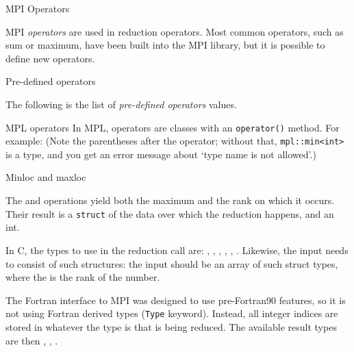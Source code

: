 
 {MPI Operators}
\label{sec:mpi-ops}

MPI \emph{operators} are used in reduction operators. Most common
operators, such as sum or maximum, have been built into the MPI
library, but it is possible to define new operators.

 {Pre-defined operators}
\label{sec:operator-list}

The following is the list of \emph{pre-defined operators}
 values.



\begin{mplnote}{MPL operators}
  In \ac{MPL}, operators are classes with an \lstinline+operator()+ method.
  For example:
  (Note the parentheses after the operator; without that, \lstinline+mpl::min<int>+
  is a type, and you get an error message about `type name is not allowed'.)
\end{mplnote}

 {Minloc and maxloc}

The  and  operations
yield both the maximum and the rank on which it occurs. Their result
is a \lstinline{struct} of the data over which the reduction happens,
and an int. 

In C, the types to use in the reduction call are:
,
,
,
,
,
.
Likewise, the input needs to consist of such structures:
the input should be an array of such struct types, where the  is
the rank of the number.

The Fortran interface to MPI was designed to use pre-Fortran90 features,
so it is not using Fortran derived types (\lstinline{Type} keyword).
Instead, all integer indices are stored in whatever the type is that is
being reduced. The available result types are then
,
,
.

